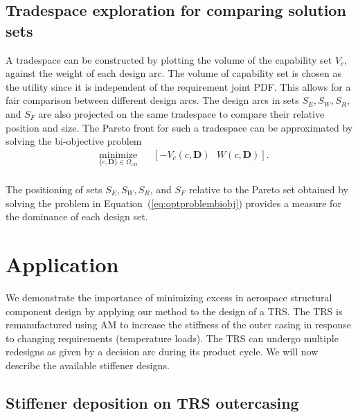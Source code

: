 \subsection{Tradespace exploration for comparing solution sets} \label{subsec:TSE}

A tradespace can be constructed by plotting the volume of the capability set $V_c$, against the weight of each design arc. The volume of capability set is chosen as the utility since it is independent of the requirement joint \ac{PDF}. This allows for a fair comparison between different design arcs. The design arcs in sets $S_E,S_W,S_R$, and $S_F$ are also projected on the same tradespace to compare their relative position and size.
The Pareto front for such a tradespace can be approximated by solving the bi-objective problem
%
\begin{equation}
	\label{eq:optproblembiobj}
	\begin{aligned}
		& \underset{\{c,\mathbf{D}\}\in\Omega_{cD}}{\text{minimize}}
		& & \left[ -V_c(c,\mathbf{D}) ~~~W\left(c,\mathbf{D}\right)\right].\\
	\end{aligned}
\end{equation}

The positioning of sets $S_E,S_W,S_R$, and $S_F$ relative to the Pareto set obtained by solving the problem in Equation~(\ref{eq:optproblembiobj}) provides a measure for the dominance of each design set.

\section{Application} \label{sec:TSEcasestudy}

We demonstrate the importance of minimizing excess in aerospace structural component design by applying our method to the design of a \acf{TRS}. The \ac{TRS} is remanufactured using \ac{AM} to increase the stiffness of the outer casing in response to changing requirements (temperature loads). The \ac{TRS} can undergo multiple redesigns as given by a decision arc during its product cycle. We will now describe the available stiffener designs.

\subsection{Stiffener deposition on \ac{TRS} outercasing} \label{subsec:stiffeners}


